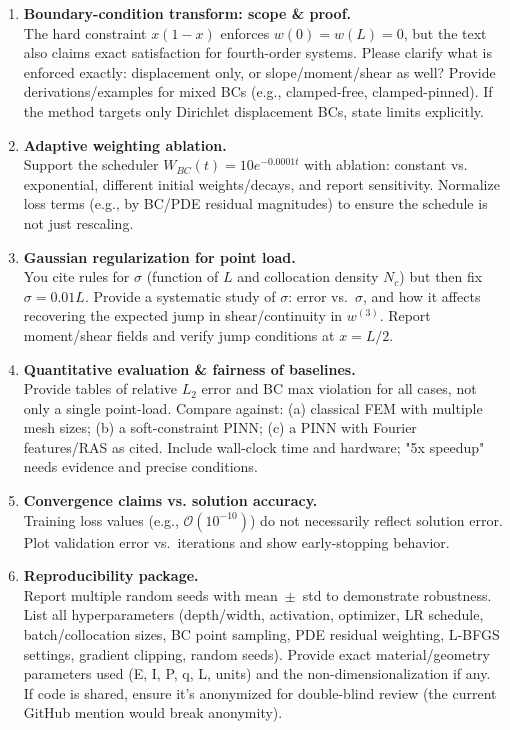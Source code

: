 \documentclass[11pt]{article}
\begin{document}
\begin{enumerate}
    \item \textbf{Boundary-condition transform: scope \& proof.}\\
    The hard constraint $x(1-x)$ enforces $w(0)=w(L)=0$, but the text also claims exact satisfaction for fourth-order systems. Please clarify what is enforced exactly: displacement only, or slope/moment/shear as well? Provide derivations/examples for mixed BCs (e.g., clamped-free, clamped-pinned). If the method targets only Dirichlet displacement BCs, state limits explicitly.
    
    \item \textbf{Adaptive weighting ablation.}\\
    Support the scheduler $W_{BC}(t)=10e^{-0.0001t}$ with ablation: constant vs. exponential, different initial weights/decays, and report sensitivity. Normalize loss terms (e.g., by BC/PDE residual magnitudes) to ensure the schedule is not just rescaling.
    
    \item \textbf{Gaussian regularization for point load.}\\
    You cite rules for $\sigma$ (function of $L$ and collocation density $N_c$) but then fix $\sigma=0.01L$. Provide a systematic study of $\sigma$: error vs.\ $\sigma$, and how it affects recovering the expected jump in shear/continuity in $w^{(3)}$. Report moment/shear fields and verify jump conditions at $x=L/2$.
    
    \item \textbf{Quantitative evaluation \& fairness of baselines.}\\
    Provide tables of relative $L_2$ error and BC max violation for all cases, not only a single point-load. Compare against: (a) classical FEM with multiple mesh sizes; (b) a soft-constraint PINN; (c) a PINN with Fourier features/RAS as cited. Include wall-clock time and hardware; "5x speedup" needs evidence and precise conditions.
    
    \item \textbf{Convergence claims vs. solution accuracy.}\\
    Training loss values (e.g., $\mathcal{O}(10^{-10})$) do not necessarily reflect solution error. Plot validation error vs.\ iterations and show early-stopping behavior.
    
    \item \textbf{Reproducibility package.}\\
    Report multiple random seeds with mean~$\pm$~std to demonstrate robustness. List all hyperparameters (depth/width, activation, optimizer, LR schedule, batch/collocation sizes, BC point sampling, PDE residual weighting, L-BFGS settings, gradient clipping, random seeds). Provide exact material/geometry parameters used (E, I, P, q, L, units) and the non-dimensionalization if any. If code is shared, ensure it's anonymized for double-blind review (the current GitHub mention would break anonymity).
    

\end{enumerate}
\end{document}
